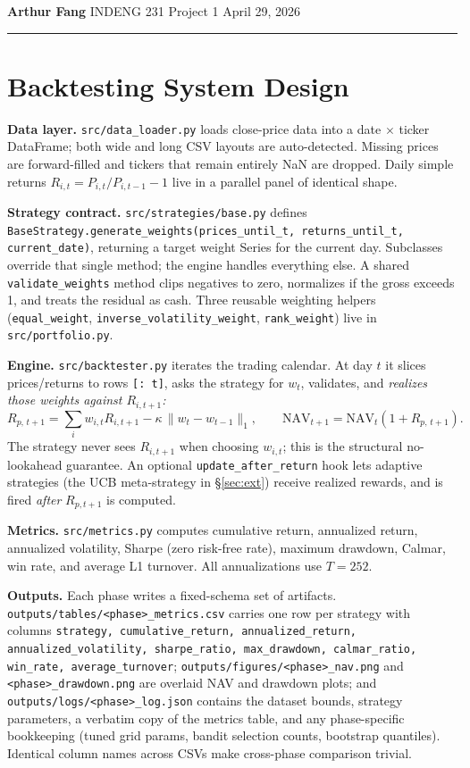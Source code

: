 \documentclass[11pt]{article}
\begin{document}
\noindent\textbf{Arthur Fang} \hfill INDENG 231 Project 1 \hfill April 29, 2026

\vspace{0.6em}\hrule\vspace{0.6em}

\section{Backtesting System Design}

\textbf{Data layer.} \texttt{src/data\_loader.py} loads close-price data
into a date $\times$ ticker DataFrame; both wide and long CSV layouts are
auto-detected. Missing prices are forward-filled and tickers that remain
entirely NaN are dropped. Daily simple returns
$R_{i,t} = P_{i,t}/P_{i,t-1} - 1$ live in a parallel panel of identical
shape.

\textbf{Strategy contract.} \texttt{src/strategies/base.py} defines
\texttt{BaseStrategy.generate\_weights(prices\_until\_t, returns\_until\_t,
current\_date)}, returning a target weight Series for the current day.
Subclasses override that single method; the engine handles everything
else. A shared \texttt{validate\_weights} method clips negatives to zero,
normalizes if the gross exceeds 1, and treats the residual as cash. Three
reusable weighting helpers
(\texttt{equal\_weight}, \texttt{inverse\_volatility\_weight},
\texttt{rank\_weight}) live in \texttt{src/portfolio.py}.

\textbf{Engine.} \texttt{src/backtester.py} iterates the trading calendar.
At day $t$ it slices prices/returns to rows \texttt{[: t]}, asks the
strategy for $w_t$, validates, and \emph{realizes those weights against
$R_{i,t+1}$:}
\[
   R_{p,\,t+1} = \sum_i w_{i,t} R_{i,t+1} - \kappa\,\lVert w_t - w_{t-1}\rVert_1,
   \qquad
   \mathrm{NAV}_{t+1} = \mathrm{NAV}_t (1 + R_{p,\,t+1}).
\]
The strategy never sees $R_{i,t+1}$ when choosing $w_{i,t}$; this is the
structural no-lookahead guarantee. An optional
\texttt{update\_after\_return} hook lets adaptive strategies (the UCB
meta-strategy in \S\ref{sec:ext}) receive realized rewards, and is fired
\emph{after} $R_{p,t+1}$ is computed.

\textbf{Metrics.} \texttt{src/metrics.py} computes cumulative return,
annualized return, annualized volatility, Sharpe (zero risk-free rate),
maximum drawdown, Calmar, win rate, and average L1 turnover. All
annualizations use $T = 252$.

\textbf{Outputs.} Each phase writes a fixed-schema set of artifacts.
\texttt{outputs/tables/<phase>\_metrics.csv} carries one row per
strategy with columns \texttt{strategy, cumulative\_return,
annualized\_return, annualized\_volatility, sharpe\_ratio,
max\_drawdown, calmar\_ratio, win\_rate, average\_turnover};
\texttt{outputs/figures/<phase>\_nav.png} and
\texttt{<phase>\_drawdown.png} are overlaid NAV and drawdown plots; and
\texttt{outputs/logs/<phase>\_log.json} contains the dataset bounds,
strategy parameters, a verbatim copy of the metrics table, and any
phase-specific bookkeeping (tuned grid params, bandit selection counts,
bootstrap quantiles). Identical column names across CSVs make
cross-phase comparison trivial.
\end{document}
